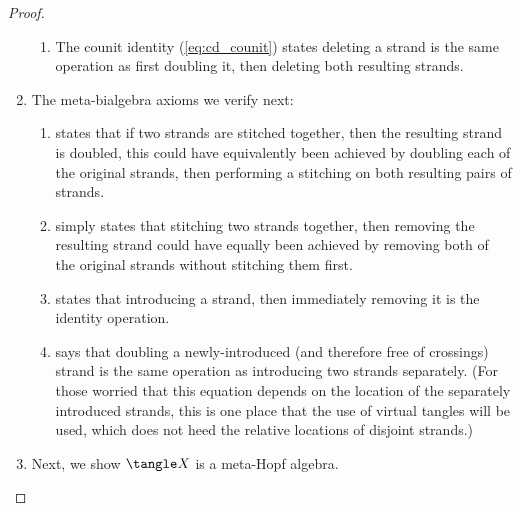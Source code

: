 \begin{proof}
\begin{enumerate}
\begin{enumerate}
                        \item The counit identity (\cref{eq:cd_counit}) states
                                deleting a strand is the same operation as first
                                doubling it, then deleting both resulting
                                strands.
                \end{enumerate}
        \item The meta-bialgebra axioms we verify next:
                \begin{enumerate}
                        \item {} states that if two
                                strands are stitched together, then the
                                resulting strand is doubled, this could have
                                equivalently been achieved by doubling each of
                                the original strands, then performing a
                                stitching on both resulting pairs of strands.
                        \item {} simply states that
                                stitching two strands together, then removing
                                the resulting strand could have equally been
                                achieved by removing both of the original
                                strands without stitching them first.
                        \item {} states that introducing a
                                strand, then immediately removing it is the
                                identity operation.
                        \item {} says that doubling a
                                newly-introduced (and therefore free of
                                crossings) strand is the same operation as
                                introducing two strands separately. (For those
                                worried that this equation depends on the
                                location of the separately introduced strands,
                                this is one place that the use of virtual
                                tangles will be used, which does not heed the
                                relative locations of disjoint strands.)
                        \end{enumerate}
                \item Next, we show $\tangle X$ is a meta-Hopf algebra.

\end{enumerate}
\end{proof}
